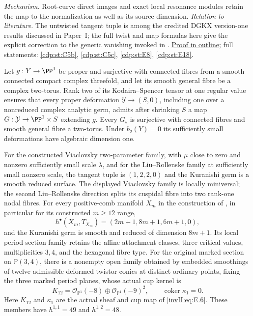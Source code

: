 \textit{Mechanism.} Root-curve direct images and exact local
resonance modules retain the map to the normalization as well as
its source dimension.
\textit{Relation to literature.} The untwisted tangent tuple is
among the credited DGKX version-one results discussed in Paper~I;
the full twist and map formulas here give the explicit correction
to the generic vanishing invoked in \cite[Theorem~2.2]{CDP2020}.
\hyperlink{outline-II-E}{Proof in outline}; full statements:
\ref{cdp:st:C5b}, \ref{cdp:st:C5c}, \ref{cdp:st:E8},
\ref{cdp:st:E18}.

\hypertarget{main-II-F}{}
\begin{maintheorem}
\hypertarget{tag-03K7}{}\label{series:II:F}
Let $g:Y\to\PP^1$ be proper and surjective with connected fibres
from a smooth connected compact complex threefold, and let its
smooth general fibre be a complex two-torus. Rank two of its
Kodaira--Spencer tensor at one regular value ensures that every
proper deformation $\mathcal Y\to(S,0)$, including one over a
nonreduced complex analytic germ, admits after shrinking $S$ a
map $G:\mathcal Y\to\PP^1\times S$ extending $g$. Every $G_s$
is surjective with connected fibres and smooth general fibre a
two-torus. Under $b_2(Y)=0$ its sufficiently small deformations
have algebraic dimension one.

For the constructed Viaclovsky two-parameter family, with
$\mu$ close to zero and nonzero sufficiently small scale
$\lambda$, and for the Liu--Rollenske family at sufficiently
small nonzero scale, the tangent tuple is $(1,2,2,0)$ and the
Kuranishi germ is a smooth reduced surface. The displayed
Viaclovsky family is locally miniversal; the second
Liu--Rollenske direction splits its cuspidal fibre into two
rank-one nodal fibres. For every positive-comb manifold $X_m$
in the construction of \cite{Viaclovsky2026Combs}, in particular
for its constructed $m\ge12$ range,
\[
 h^\bullet(X_m,T_{X_m})=(2m+1,8m+1,6m+1,0),
\]
and the Kuranishi germ is smooth and reduced of dimension $8m+1$.
Its local period-section family retains the affine attachment
classes, three critical values, multiplicities $3,4$, and the
hexagonal fibre type.
For the original marked section on $\mathbb P(3,4)$, there is a
nonempty open family obtained by embedded smoothings of twelve
admissible deformed twistor conics at distinct ordinary points,
fixing the three marked period planes, whose actual cup kernel is
\[
 K_{12}=\mathcal O_{\mathbb P^1}(-8)
       \oplus\mathcal O_{\mathbb P^1}(-9)^2,
 \qquad \operatorname{coker}\kappa_1=0.
\]
Here $K_{12}$ and $\kappa_1$ are the actual sheaf and cup map of
\eqref{invII:eq:E.6}. These members have
$h^{1,1}=49$ and $h^{1,2}=48$.


\end{maintheorem}

